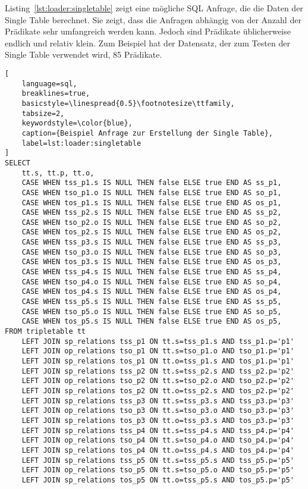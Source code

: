 \documentclass[
  a4paper,
  12pt,
  oneside,
  parskip=half,
  headsepline,
]{scrartcl}
\begin{document}
Listing~\ref{lst:loader:singletable} zeigt eine mögliche SQL Anfrage, die die
Daten der Single Table berechnet. Sie zeigt, dass die Anfragen abhängig von der
Anzahl der Prädikate sehr umfangreich werden kann. Jedoch sind Prädikate
üblicherweise endlich und relativ klein. Zum Beispiel hat der Datensatz, der
zum Testen der Single Table verwendet wird, 85 Prädikate.

\begin{minipage}{\linewidth}
\begin{lstlisting}[
	language=sql,
	breaklines=true,
	basicstyle=\linespread{0.5}\footnotesize\ttfamily,
	tabsize=2,
	keywordstyle=\color{blue},
	caption={Beispiel Anfrage zur Erstellung der Single Table},
	label=lst:loader:singletable
]
SELECT 
	tt.s, tt.p, tt.o,
	CASE WHEN tss_p1.s IS NULL THEN false ELSE true END AS ss_p1,
	CASE WHEN tso_p1.o IS NULL THEN false ELSE true END AS so_p1,
	CASE WHEN tos_p1.s IS NULL THEN false ELSE true END AS os_p1,
	CASE WHEN tss_p2.s IS NULL THEN false ELSE true END AS ss_p2,
	CASE WHEN tso_p2.o IS NULL THEN false ELSE true END AS so_p2,
	CASE WHEN tos_p2.s IS NULL THEN false ELSE true END AS os_p2,
	CASE WHEN tss_p3.s IS NULL THEN false ELSE true END AS ss_p3,
	CASE WHEN tso_p3.o IS NULL THEN false ELSE true END AS so_p3,
	CASE WHEN tos_p3.s IS NULL THEN false ELSE true END AS os_p3,
	CASE WHEN tss_p4.s IS NULL THEN false ELSE true END AS ss_p4,
	CASE WHEN tso_p4.o IS NULL THEN false ELSE true END AS so_p4,
	CASE WHEN tos_p4.s IS NULL THEN false ELSE true END AS os_p4,
	CASE WHEN tss_p5.s IS NULL THEN false ELSE true END AS ss_p5,
	CASE WHEN tso_p5.o IS NULL THEN false ELSE true END AS so_p5,
	CASE WHEN tos_p5.s IS NULL THEN false ELSE true END AS os_p5,
FROM tripletable tt
	LEFT JOIN sp_relations tss_p1 ON tt.s=tss_p1.s AND tss_p1.p='p1' 
	LEFT JOIN op_relations tso_p1 ON tt.s=tso_p1.o AND tso_p1.p='p1' 
	LEFT JOIN sp_relations tos_p1 ON tt.o=tss_p1.s AND tos_p1.p='p1'
	LEFT JOIN sp_relations tss_p2 ON tt.s=tss_p2.s AND tss_p2.p='p2' 
	LEFT JOIN op_relations tso_p2 ON tt.s=tso_p2.o AND tso_p2.p='p2' 
	LEFT JOIN sp_relations tos_p2 ON tt.o=tss_p2.s AND tos_p2.p='p2'
	LEFT JOIN sp_relations tss_p3 ON tt.s=tss_p3.s AND tss_p3.p='p3' 
	LEFT JOIN op_relations tso_p3 ON tt.s=tso_p3.o AND tso_p3.p='p3' 
	LEFT JOIN sp_relations tos_p3 ON tt.o=tss_p3.s AND tos_p3.p='p3'
	LEFT JOIN sp_relations tss_p4 ON tt.s=tss_p4.s AND tss_p4.p='p4' 
	LEFT JOIN op_relations tso_p4 ON tt.s=tso_p4.o AND tso_p4.p='p4' 
	LEFT JOIN sp_relations tos_p4 ON tt.o=tss_p4.s AND tos_p4.p='p4'
	LEFT JOIN sp_relations tss_p5 ON tt.s=tss_p5.s AND tss_p5.p='p5' 
	LEFT JOIN op_relations tso_p5 ON tt.s=tso_p5.o AND tso_p5.p='p5' 
	LEFT JOIN sp_relations tos_p5 ON tt.o=tss_p5.s AND tos_p5.p='p5'
\end{lstlisting}
\end{minipage}
\end{document}
